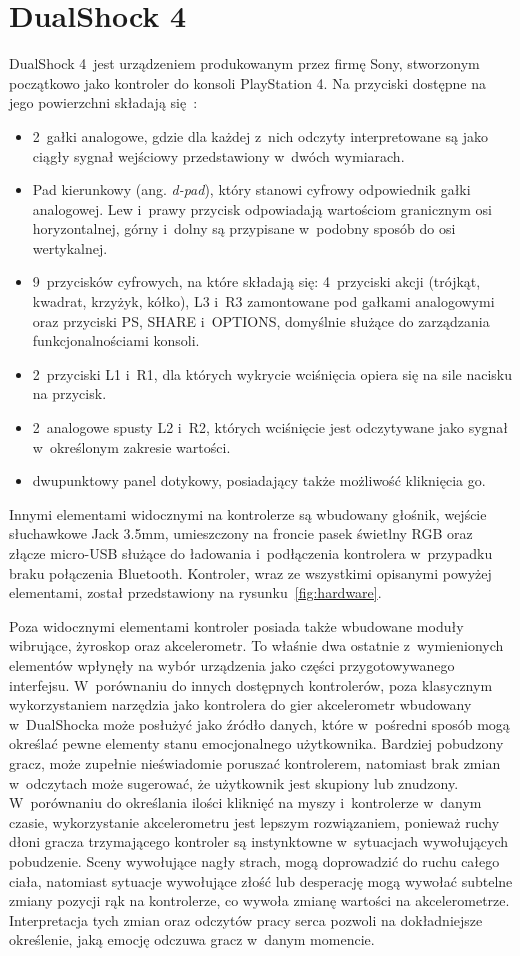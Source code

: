 \section{DualShock 4}
DualShock 4~jest urządzeniem produkowanym przez firmę Sony, stworzonym początkowo jako kontroler do konsoli PlayStation 4. Na przyciski dostępne na jego powierzchni składają się~\cite{dualshock_specification}:
\begin{itemize}
	\item 2~gałki analogowe, gdzie dla każdej z~nich odczyty interpretowane są jako ciągły sygnał wejściowy przedstawiony w~dwóch wymiarach.
	\item Pad kierunkowy (ang. \textit{d-pad}), który stanowi cyfrowy odpowiednik gałki analogowej. Lew i~prawy przycisk odpowiadają wartościom granicznym osi horyzontalnej, górny i~dolny są przypisane w~podobny sposób do osi wertykalnej.
	\item 9~przycisków cyfrowych, na które składają się: 4~przyciski akcji (trójkąt, kwadrat, krzyżyk, kółko), L3 i~R3 zamontowane pod gałkami analogowymi oraz przyciski PS, SHARE i~OPTIONS, domyślnie służące do zarządzania funkcjonalnościami konsoli.
	\item 2~przyciski L1 i~R1, dla których wykrycie wciśnięcia opiera się na sile nacisku na przycisk.
	\item 2~analogowe spusty L2 i~R2, których wciśnięcie jest odczytywane jako sygnał w~określonym zakresie wartości.
	\item dwupunktowy panel dotykowy, posiadający także możliwość kliknięcia go.
\end{itemize}
Innymi elementami widocznymi na kontrolerze są wbudowany głośnik, wejście słuchawkowe Jack 3.5mm, umieszczony na froncie pasek świetlny RGB oraz złącze micro-USB służące do ładowania i~podłączenia kontrolera w~przypadku braku połączenia Bluetooth. Kontroler, wraz ze wszystkimi opisanymi powyżej elementami, został przedstawiony na rysunku~\ref{fig:hardware}.

Poza widocznymi elementami kontroler posiada także wbudowane moduły wibrujące, żyroskop oraz akcelerometr. To właśnie dwa ostatnie z~wymienionych elementów wpłynęły na wybór urządzenia jako części przygotowywanego interfejsu. W~porównaniu do innych dostępnych kontrolerów, poza klasycznym wykorzystaniem narzędzia jako kontrolera do gier akcelerometr wbudowany w~DualShocka może posłużyć jako źródło danych, które w~pośredni sposób mogą określać pewne elementy stanu emocjonalnego użytkownika. Bardziej pobudzony gracz, może zupełnie nieświadomie poruszać kontrolerem, natomiast brak zmian w~odczytach może sugerować, że użytkownik jest skupiony lub znudzony. W~porównaniu do określania ilości kliknięć na myszy i~kontrolerze w~danym czasie, wykorzystanie akcelerometru jest lepszym rozwiązaniem, ponieważ ruchy dłoni gracza trzymającego kontroler są instynktowne w~sytuacjach wywołujących pobudzenie. Sceny wywołujące nagły strach, mogą doprowadzić do ruchu całego ciała, natomiast sytuacje wywołujące złość lub desperację mogą wywołać subtelne zmiany pozycji rąk na kontrolerze, co wywoła zmianę wartości na akcelerometrze. Interpretacja tych zmian oraz odczytów pracy serca pozwoli na dokładniejsze określenie, jaką emocję odczuwa gracz w~danym momencie.

